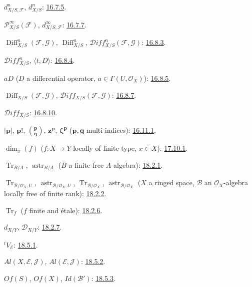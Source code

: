 $d^n_{X/S,\mathcal{F}}$, $d^n_{X/S}$: {\hyperlink{ega4.c04.statement.16-7-5}{16.7.5}}.

$\mathcal{P}^{\infty}_{X/S}(\mathcal{F})$,
$d^{\infty}_{X/S,\mathcal{F}}$: {\hyperlink{ega4.c04.statement.16-7-7}{16.7.7}}.

$\operatorname{Diff}^{n}_{X/S}(\mathcal{F},\mathcal{G})$,
$\operatorname{Diff}^{n}_{X/S}$,
$\mathcal{D}iff^{n}_{X/S}(\mathcal{F},\mathcal{G})$:
{\hyperlink{ega4.c04.statement.16-8-3}{16.8.3}}.

$\mathcal{D}iff^{n}_{X/S}$, $\langle t,D\rangle$:
{\hyperlink{ega4.c04.prop.16-8-4}{16.8.4}}.

$aD$ ($D$ a differential operator, $a\in\Gamma(U,\mathcal{O}_X)$):
{\hyperlink{ega4.c04.statement.16-8-5}{16.8.5}}.

$\operatorname{Diff}_{X/S}(\mathcal{F},\mathcal{G})$,
$\mathcal{D}iff_{X/S}(\mathcal{F},\mathcal{G})$:
{\hyperlink{ega4.c04.statement.16-8-7}{16.8.7}}.

$\mathcal{D}iff_{X/S}$: {\hyperlink{ega4.c04.cor.16-8-10}{16.8.10}}.

$|\mathbf p|$, $\mathbf p!$, $\binom{\mathbf p}{\mathbf q}$,
$\mathbf z^{\mathbf p}$, $\boldsymbol\zeta^{\mathbf p}$
($\mathbf p,\mathbf q$ multi-indices): {\hyperlink{ega4.c04.statement.16-11-1}{16.11.1}}.

$\dim_x(f)$ ($f:X\to Y$ locally of finite type, $x\in X$):
{\hyperlink{ega4.c04.def.17-10-1}{17.10.1}}.

$\operatorname{Tr}_{B/A}$, $\operatorname{astr}_{B/A}$
($B$ a finite free $A$-algebra): {\hyperlink{ega4.c04.statement.18-2-1}{18.2.1}}.

$\operatorname{Tr}_{\mathcal B/\mathcal O_X,U}$,
$\operatorname{astr}_{\mathcal B/\mathcal O_X,U}$,
$\operatorname{Tr}_{\mathcal B/\mathcal O_X}$,
$\operatorname{astr}_{\mathcal B/\mathcal O_X}$
($X$ a ringed space, $\mathcal B$ an $\mathcal O_X$-algebra locally free
of finite rank): {\hyperlink{ega4.c04.statement.18-2-2}{18.2.2}}.

$\operatorname{Tr}_f$ ($f$ finite and \'etale): {\hyperlink{ega4.c04.cor.18-2-6}{18.2.6}}.

$d_{X/Y}$, $\mathcal D_{X/Y}$: {\hyperlink{ega4.c04.item.18-2-7}{18.2.7}}.

${}^{t}V_{\mathcal E}$: {\hyperlink{ega4.c04.statement.18-5-1}{18.5.1}}.

$Al(X,\mathcal E,\mathcal J)$, $Al(\mathcal E,\mathcal J)$:
{\hyperlink{ega4.c04.statement.18-5-2}{18.5.2}}.

$Of(S)$, $Of(X)$, $Id(\mathcal B')$: {\hyperlink{ega4.c04.lem.18-5-3}{18.5.3}}.

